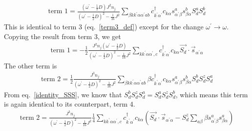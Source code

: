 \documentclass{revtex4-2}
\numberwithin{equation}{section}
\begin{document}
\begin{equation}\begin{aligned}
	\text{term 1} = \frac{\left(\omega^\prime - \frac{1}{2}D\right)J^2 n_j} {\left(\omega^\prime - \frac{1}{2}D\right)^2 - \frac{1}{16}J^2} \sum_{\beta k k^\prime \alpha \alpha^\prime a b} c^\dagger_{k^\prime\alpha^\prime}c_{k\alpha} s^a_{\alpha^\prime \beta}s^b_{\beta \alpha} S_d^a S_d^b
\end{aligned}\end{equation}
This is identical to term 3 (eq.~\ref{term3_def}) except for the change \(\omega^\prime \to \omega\). Copying the result from term 3, we get
\begin{equation}\begin{aligned}
	\label{term3}
	\text{term 1} = -\frac{1}{2}\frac{J^2 n_j \left(\omega^\prime - \frac{1}{2}D\right)}{\left(\omega^\prime - \frac{1}{2}D\right)^2 - \frac{1}{16}J^2} \sum_{k k^\prime \alpha \alpha^\prime,c} c^\dagger_{k^\prime\alpha^\prime} c_{k\alpha} \vec{S_d}\cdot\vec{s}_{\alpha^\prime \alpha}
\end{aligned}\end{equation}
The other term is
\begin{equation}\begin{aligned}
	\text{term 2} = \frac{1}{2}\frac{J^3 n_j}{\left(\omega^\prime - \frac{1}{2}D\right)^2 - \frac{1}{16}J^2} \sum_{\beta k k^\prime \alpha \alpha^\prime a b} \beta c^\dagger_{k^\prime\alpha^\prime}c_{k\alpha} s^a_{\alpha^\prime \beta}s^b_{\beta \alpha} S_d^b S_d^z S_d^a 
\end{aligned}\end{equation}
From eq.~\ref{identity_SSS}, we know that \(S_d^b S_d^z S_d^a =  S_d^a S_d^z S_d^b\), which means this term is again identical to its counterpart, term 4.
\begin{equation}\begin{aligned}
	\label{term4}
	\text{term 2} = \frac{J^3 n_j }{\left(\omega^\prime - \frac{1}{2}D\right)^2 - \frac{1}{16}J^2} \frac{1}{4}\sum_{k k^\prime \alpha \alpha^\prime,c} c^\dagger_{k^\prime\alpha^\prime} c_{k\alpha} \left(\vec{S_d}\cdot\vec{s}_{\alpha^\prime\alpha} -S_d^z \sum_{a \beta} \beta s^a_{\alpha^\prime\beta} s^a_{\beta\alpha} \right)
\end{aligned}\end{equation}
\end{document}
